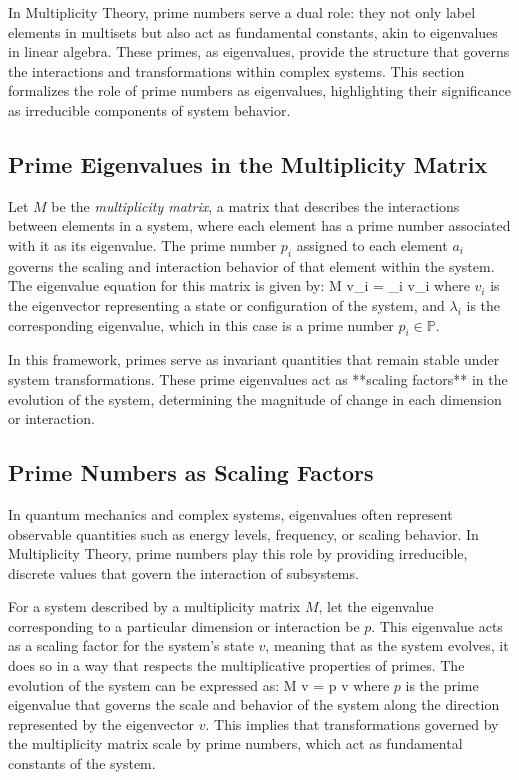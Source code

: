 \documentclass[12pt]{article}
\begin{document}
In Multiplicity Theory, prime numbers serve a dual role: they not only label elements in multisets but also act as fundamental constants, akin to eigenvalues in linear algebra. These primes, as eigenvalues, provide the structure that governs the interactions and transformations within complex systems. This section formalizes the role of prime numbers as eigenvalues, highlighting their significance as irreducible components of system behavior.

\subsection{Prime Eigenvalues in the Multiplicity Matrix}

Let \( M \) be the \textit{multiplicity matrix}, a matrix that describes the interactions between elements in a system, where each element has a prime number associated with it as its eigenvalue. The prime number \( p_i \) assigned to each element \( a_i \) governs the scaling and interaction behavior of that element within the system. The eigenvalue equation for this matrix is given by:
\]
M v_i = \lambda_i v_i
\]
where \( v_i \) is the eigenvector representing a state or configuration of the system, and \( \lambda_i \) is the corresponding eigenvalue, which in this case is a prime number \( p_i \in \mathbb{P} \).

In this framework, primes serve as invariant quantities that remain stable under system transformations. These prime eigenvalues act as **scaling factors** in the evolution of the system, determining the magnitude of change in each dimension or interaction.

\subsection{Prime Numbers as Scaling Factors}

In quantum mechanics and complex systems, eigenvalues often represent observable quantities such as energy levels, frequency, or scaling behavior. In Multiplicity Theory, prime numbers play this role by providing irreducible, discrete values that govern the interaction of subsystems.

For a system described by a multiplicity matrix \( M \), let the eigenvalue corresponding to a particular dimension or interaction be \( p \). This eigenvalue acts as a scaling factor for the system's state \( v \), meaning that as the system evolves, it does so in a way that respects the multiplicative properties of primes. The evolution of the system can be expressed as:
\]
M v = p v
\]
where \( p \) is the prime eigenvalue that governs the scale and behavior of the system along the direction represented by the eigenvector \( v \). This implies that transformations governed by the multiplicity matrix scale by prime numbers, which act as fundamental constants of the system.
\end{document}
